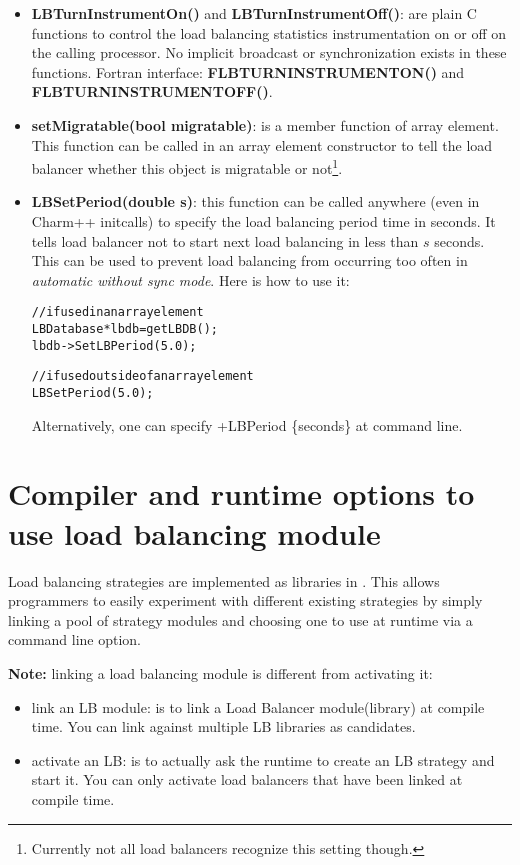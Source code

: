 \begin{itemize}
\item {\bf LBTurnInstrumentOn()} and {\bf LBTurnInstrumentOff()}: are plain C
      functions to control the load balancing statistics instrumentation
      on or off on the calling processor. No implicit broadcast or 
      synchronization exists in these functions.
      Fortran interface: {\bf FLBTURNINSTRUMENTON()} and {\bf FLBTURNINSTRUMENTOFF()}.
\item {\bf setMigratable(bool migratable)}: is a member function of array
      element. This function can be called 
      in an array element constructor to tell the load balancer whether this object
      is migratable or not\footnote{Currently not all load balancers 
      recognize this setting though.}.
\item {\bf LBSetPeriod(double s)}: this function can be called
      anywhere (even in Charm++ initcalls) to specify 
      the load balancing period time in seconds. 
      It tells load balancer not to start next 
      load balancing in less than $s$ seconds. This can be used to prevent 
      load balancing from occurring too often in 
      {\em automatic without sync mode}. Here is how to use it:
      \begin{alltt}
// if used in an array element
LBDatabase *lbdb = getLBDB();
lbdb->SetLBPeriod(5.0);

// if used outside of an array element
LBSetPeriod(5.0);
\end{alltt}
      Alternatively, one can specify +LBPeriod \{seconds\} at command line.
\end{itemize}

\section{Compiler and runtime options to use load balancing module}
\label{lbOption}

Load balancing strategies are implemented as libraries in \charmpp{}. This
allows programmers to easily experiment with different existing strategies 
by simply linking a pool of strategy modules and choosing
one to use at runtime via a command line option.

{\bf Note:} linking a load balancing module is different from activating it:
\begin{itemize}
\item link an LB module: is to link a Load Balancer module(library) at 
   compile time. You can link against multiple LB libraries as candidates.
\item activate an LB: is to actually ask the runtime to create an LB strategy and 
   start it. You can only activate load balancers that have been linked at
   compile time.
\end{itemize}


